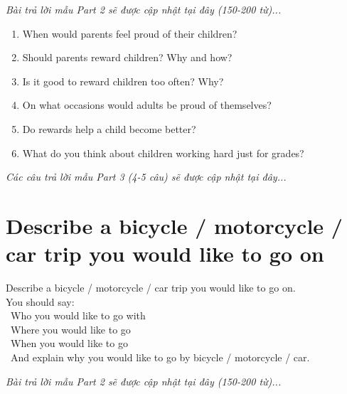 \vspace{1em}
\textit{Bài trả lời mẫu Part 2 sẽ được cập nhật tại đây (150-200 từ)...}
\vspace{2em}

\begin{ieltsprompt}
\begin{enumerate}[itemsep=4pt]
    \item When would parents feel proud of their children?
    \item Should parents reward children? Why and how?
    \item Is it good to reward children too often? Why?
    \item On what occasions would adults be proud of themselves?
    \item Do rewards help a child become better?
    \item What do you think about children working hard just for grades?
\end{enumerate}
\end{ieltsprompt}

\vspace{1em}
\textit{Các câu trả lời mẫu Part 3 (4-5 câu) sẽ được cập nhật tại đây...}
\vspace{2em}

\section{Describe a bicycle / motorcycle / car trip you would like to go on}
\begin{ieltsprompt}
Describe a bicycle / motorcycle / car trip you would like to go on. \\
You should say: \\
\textbullet\ Who you would like to go with \\
\textbullet\ Where you would like to go \\
\textbullet\ When you would like to go \\
\textbullet\ And explain why you would like to go by bicycle / motorcycle / car. \\
\end{ieltsprompt}

\vspace{1em}
\textit{Bài trả lời mẫu Part 2 sẽ được cập nhật tại đây (150-200 từ)...}
\vspace{2em}

